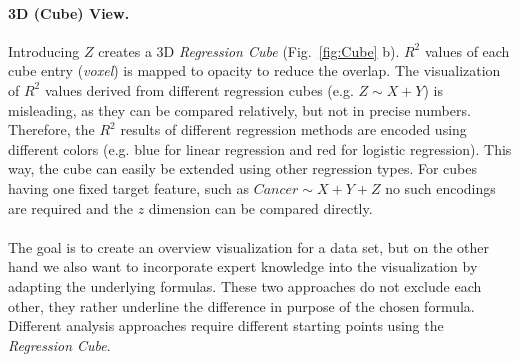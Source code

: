 \documentclass[journal]{style/vgtc} 			          %
\begin{document}
\paragraph{3D (Cube) View.}
Introducing $Z$ creates a 3D \emph{Regression Cube} (Fig.~\ref{fig:Cube} b).
$R^2$ values of each cube entry (\emph{voxel}) is mapped to opacity to reduce the overlap.
The visualization of $R^2$ values derived from different regression cubes (e.g. $Z \sim X + Y$) is misleading, as they can be compared relatively, but not in precise numbers.
Therefore, the $R^2$ results of different regression methods are encoded using different colors (e.g. blue for linear regression and red for logistic regression).
This way, the cube can easily be extended using other regression types.
For cubes having one fixed target feature, such as $Cancer \sim X + Y + Z$ no such encodings are required and the $z$ dimension can be compared directly.
\\\\
The goal is to create an overview visualization for a data set, but on the other hand we also want to incorporate expert knowledge into the visualization by adapting the underlying formulas.
These two approaches do not exclude each other, they rather underline the difference in purpose of the chosen formula.
Different analysis approaches require different starting points using the \emph{Regression Cube}.
\end{document}
